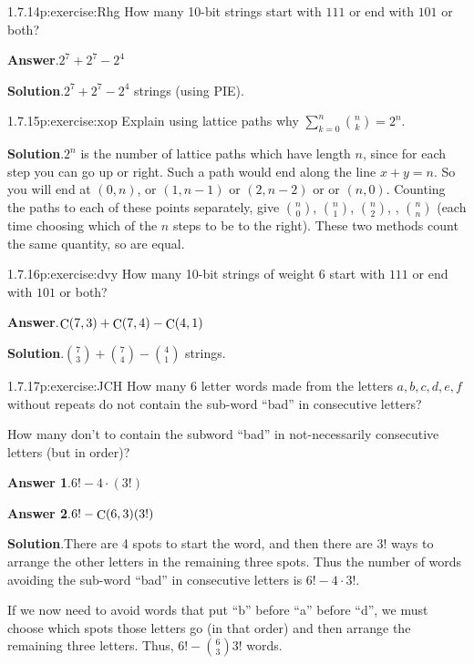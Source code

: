 \documentclass[twoside,11pt,]{book}
\newcommand{\blocktitlefont}{\relax}
\numberwithin{equation}{chapter}
\begin{document}
\begin{divisionsolution}{1.7.14}{}{p:exercise:Rhg}%
How many 10-bit strings start with \(111\) or end with \(101\) or both?%
\par\smallskip%
\noindent\textbf{\blocktitlefont Answer}.\quad{}\(2^{7}+2^{7}-2^{4}\)%
\par\smallskip%
\noindent\textbf{\blocktitlefont Solution}.\quad{}\(2^7 + 2^7 - 2^4\) strings (using PIE).%
\end{divisionsolution}%
\begin{divisionsolution}{1.7.15}{}{p:exercise:xop}%
Explain using lattice paths why \(\sum_{k=0}^n {n \choose k} = 2^n\).%
\par\smallskip%
\noindent\textbf{\blocktitlefont Solution}.\quad{}\(2^n\) is the number of lattice paths which have length \(n\), since for each step you can go up or right. Such a path would end along the line \(x + y = n\). So you will end at \((0,n)\), or \((1,n-1)\) or \((2, n-2)\) or \textellipsis{} or \((n,0)\). Counting the paths to each of these points separately, give \({n \choose 0}\), \({n \choose 1}\), \({n \choose 2}\), \textellipsis{}, \({n \choose n}\) (each time choosing which of the \(n\) steps to be to the right). These two methods count the same quantity, so are equal.%
\end{divisionsolution}%
\begin{divisionsolution}{1.7.16}{}{p:exercise:dvy}%
How many 10-bit strings of weight 6 start with \(111\) or end with \(101\) or both?%
\par\smallskip%
\noindent\textbf{\blocktitlefont Answer}.\quad{}\(\mathop{\rm C}\nolimits\!\left(7,3\right)+\mathop{\rm C}\nolimits\!\left(7,4\right)-\mathop{\rm C}\nolimits\!\left(4,1\right)\)%
\par\smallskip%
\noindent\textbf{\blocktitlefont Solution}.\quad{}\({7 \choose 3} + {7 \choose 4} - {4 \choose 1}\) strings.%
\end{divisionsolution}%
\begin{divisionsolution}{1.7.17}{}{p:exercise:JCH}%
How many 6 letter words made from the letters \(a,b,c,d,e,f\) without repeats do not contain the sub-word ``bad'' in consecutive letters?%
\par
How many don't to contain the subword ``bad'' in not-necessarily consecutive letters (but in order)?%
\par\smallskip%
\noindent\textbf{\blocktitlefont Answer 1}.\quad{}\(6!-4\cdot \left(3!\right)\)%
\par\smallskip%
\noindent\textbf{\blocktitlefont Answer 2}.\quad{}\(6!-\mathop{\rm C}\nolimits\!\left(6,3\right)\!\left(3!\right)\)%
\par\smallskip%
\noindent\textbf{\blocktitlefont Solution}.\quad{}There are 4 spots to start the word, and then there are \(3!\) ways to arrange the other letters in the remaining three spots. Thus the number of words avoiding the sub-word ``bad'' in consecutive letters is \(6! - 4\cdot 3!\text{.}\)%
\par
If we now need to avoid words that put ``b'' before ``a'' before ``d'', we must choose which spots those letters go (in that order) and then arrange the remaining three letters. Thus, \(6! - {6 \choose 3}3!\) words.%
\end{divisionsolution}%
\end{document}
